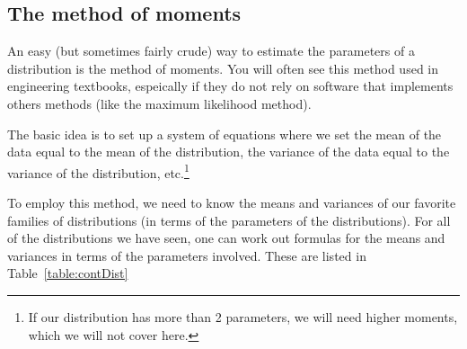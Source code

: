 \documentclass[twoside]{book}\usepackage[]{graphicx}\usepackage[]{xcolor}
\begin{document}
\subsection{The method of moments}
An easy (but sometimes fairly crude) way to estimate the parameters of a distribution
is the method of moments.  You will often see this method used in engineering textbooks,
espeically if they do not rely on software that implements others methods (like the 
maximum likelihood method).

The basic idea is to set up a system of  equations where we set the mean of the data equal to the mean of the distribution, the variance of the data equal to the variance of the distribution, etc.\footnote{If our distribution has more than 2 parameters, we will need higher moments, which we will not cover here.}  

To employ this method, we need to know the means and variances of our favorite families of distributions (in terms of the parameters of the distributions).  For all of the distributions we have seen, one can work out formulas for the means and variances in terms of the parameters involved.  These are listed in Table~\ref{table:contDist}
\end{document}
